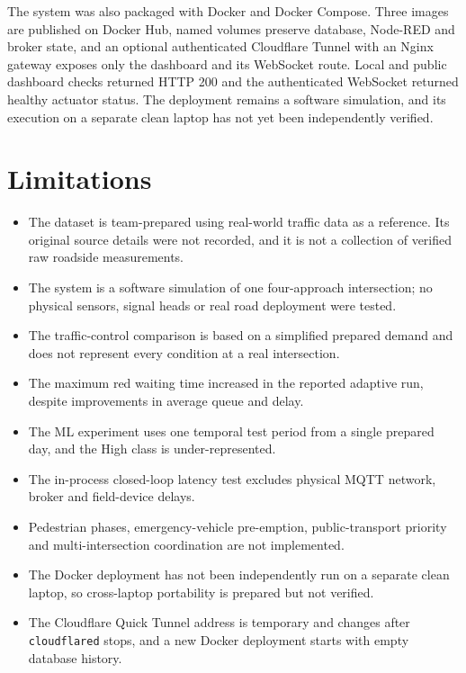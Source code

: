 \documentclass[12pt,a4paper,oneside]{report}
\begin{document}
The system was also packaged with Docker and Docker Compose. Three images are published on Docker Hub, named volumes preserve database, Node-RED and broker state, and an optional authenticated Cloudflare Tunnel with an Nginx gateway exposes only the dashboard and its WebSocket route. Local and public dashboard checks returned HTTP 200 and the authenticated WebSocket returned healthy actuator status. The deployment remains a software simulation, and its execution on a separate clean laptop has not yet been independently verified.

\section{Limitations}
\begin{itemize}
  \item The dataset is team-prepared using real-world traffic data as a reference. Its original source details were not recorded, and it is not a collection of verified raw roadside measurements.
  \item The system is a software simulation of one four-approach intersection; no physical sensors, signal heads or real road deployment were tested.
  \item The traffic-control comparison is based on a simplified prepared demand and does not represent every condition at a real intersection.
  \item The maximum red waiting time increased in the reported adaptive run, despite improvements in average queue and delay.
  \item The ML experiment uses one temporal test period from a single prepared day, and the High class is under-represented.
  \item The in-process closed-loop latency test excludes physical MQTT network, broker and field-device delays.
  \item Pedestrian phases, emergency-vehicle pre-emption, public-transport priority and multi-intersection coordination are not implemented.
  \item The Docker deployment has not been independently run on a separate clean laptop, so cross-laptop portability is prepared but not verified.
  \item The Cloudflare Quick Tunnel address is temporary and changes after \texttt{cloudflared} stops, and a new Docker deployment starts with empty database history.
\end{itemize}
\end{document}
